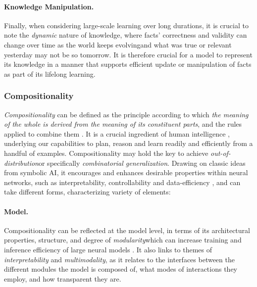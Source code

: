 \paragraph{Knowledge Manipulation.} Finally, when considering large-scale learning over long durations, it is crucial to note the \textit{dynamic} nature of knowledge, where facts' correctness and validity can change over time as the world keeps evolving\dash{}and what was true or relevant yesterday may not be so tomorrow. It is therefore crucial for a model to represent its knowledge in a manner that supports efficient update or manipulation of facts as part of its lifelong learning. 

\subsubsection{Compositionality}
\textit{Compositionality} can be defined as the principle according to which \textit{the meaning of the whole is derived from the meaning of its constituent parts}, and the rules applied to combine them \citep{compositionality,bottou}. It is a crucial ingredient of human intelligence \citep{humanthink}, underlying our capabilities to plan, reason and learn readily and efficiently from a handful of examples. Compositionality may hold the key to achieve \textit{out-of-distribution}\dash{}or specifically\dash{} \textit{combinatorial generalization}.  Drawing on classic ideas from symbolic AI, it encourages and enhances desirable properties within neural networks, such as interpretability, controllability and data-efficiency  \citep{humanthink}, and can take different forms, characterizing variety of elements: 

\paragraph{Model.}
Compositionality can be reflected at the model level, in terms of its architectural properties, structure, and degree of \textit{modularity}\dash{}which can increase training and inference efficiency of large neural models \citep{moe}. It also links to themes of \textit{interpretability} and \textit{multimodality}, as it relates to the interfaces between the different modules the model is composed of, what modes of interactions they employ, and how transparent they are.

